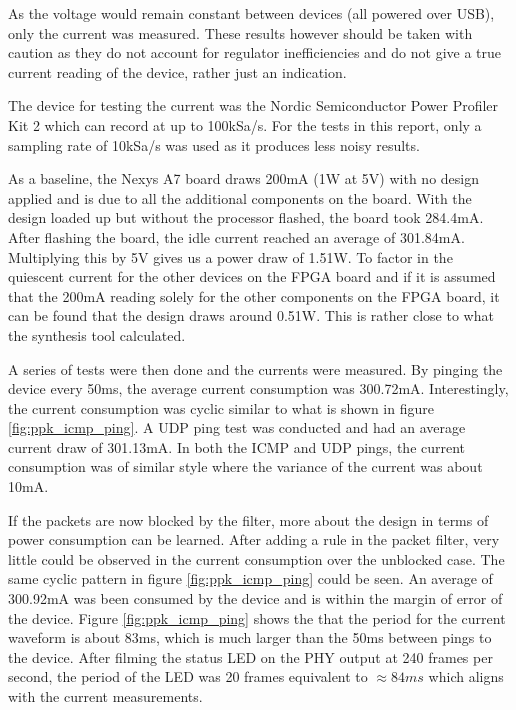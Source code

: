As the voltage would remain constant between devices (all powered over USB), only the current was measured. These results however should be taken with caution as they do not account for regulator inefficiencies and do not give a true current reading of the device, rather just an indication. 


The device for testing the current was the Nordic Semiconductor Power Profiler Kit 2 which can record at up to 100kSa/s. For the tests in this report, only a sampling rate of 10kSa/s was used as it produces less noisy results. 

As a baseline, the Nexys A7 board draws 200mA (1W at 5V) with no design applied and is due to all the additional components on the board. With the design loaded up but without the processor flashed, the board took 284.4mA. After flashing the board, the idle current reached an average of 301.84mA. Multiplying this by 5V gives us a power draw of 1.51W. To factor in the quiescent current for the other devices on the FPGA board and if it is assumed that the 200mA reading solely for the other components on the FPGA board, it can be found that the design draws around 0.51W. This is rather close to what the synthesis tool calculated. 

A series of tests were then done and the currents were measured. By pinging the device every 50ms, the average current consumption was 300.72mA. Interestingly, the current consumption was cyclic similar to what is shown in figure \ref{fig:ppk_icmp_ping}. A UDP ping test was conducted and had an average current draw of 301.13mA. In both the ICMP and UDP pings, the current consumption was of similar style where the variance of the current was about 10mA. 


If the packets are now blocked by the filter, more about the design in terms of power consumption can be learned. After adding a rule in the packet filter, very little could be observed in the current consumption over the unblocked case. The same cyclic pattern in figure \ref{fig:ppk_icmp_ping} could be seen. An average of 300.92mA was been consumed by the device and is within the margin of error of the device. Figure \ref{fig:ppk_icmp_ping} shows the that the period for the current waveform is about 83ms, which is much larger than the 50ms between pings to the device. After filming the status LED on the PHY output at 240 frames per second, the period of the LED was 20 frames equivalent to $\approx 84ms$ which aligns with the current measurements. 


